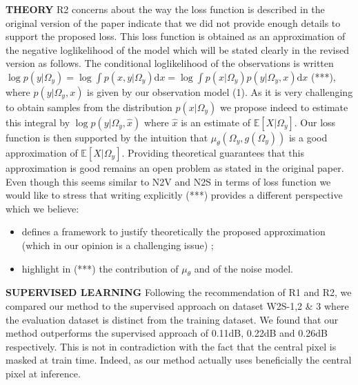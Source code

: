 \documentclass{article}
\begin{document}
\textbf{THEORY}
R2 concerns about the way the loss function is described in the original version of the paper indicate that we did not provide enough details to support the proposed loss. This loss function is obtained as an approximation of the negative loglikelihood of the model which will be stated clearly in the revised version as follows.
The conditional loglikelihood of the observations is written $ \log p(y|\Omega_y) = \log \int p(x,y|\Omega_y) \mathrm{d}x = \log \int p(x|\Omega_y)p(y|\Omega_y,x) \mathrm{d}x$ (***), where $p(y|\Omega_y,x)$ is given by our observation model (1).
As it is very challenging to obtain samples from the distribution $p(x|\Omega_y)$ we propose indeed to estimate this integral by $\log p(y|\Omega_y,\hat {x})$ where $\hat {x}$ is an estimate of $\mathbb{E}[X|\Omega_y]$. Our loss function is then supported by the intuition that $\mu_\theta(\Omega_y,g(\Omega_y))$ is a good approximation of $\mathbb{E}[X|\Omega_y]$. Providing theoretical guarantees  that this approximation is good remains an open problem as stated in the original paper. Even though this seems similar to N2V and N2S in terms of loss function we would like to stress that writing explicitly (***) provides a different perspective which we believe:
\begin{itemize}
  \item defines a framework to justify theoretically the proposed approximation (which in our opinion is a challenging issue) ;
  \item highlight in (***) the contribution of $\mu_\theta$ and of the noise model.
\end{itemize}

\textbf{SUPERVISED LEARNING}
Following the recommendation of R1 and R2, we compared our method to the supervised approach on dataset W2S-1,2 \& 3 where the evaluation dataset is distinct from the training dataset. We found that our method outperforms the supervised approach of 0.11dB, 0.22dB and 0.26dB respectively. This is not in contradiction with the fact that the central pixel is masked at train time. Indeed, as our method actually uses beneficially the central pixel at inference.

\end{document}
